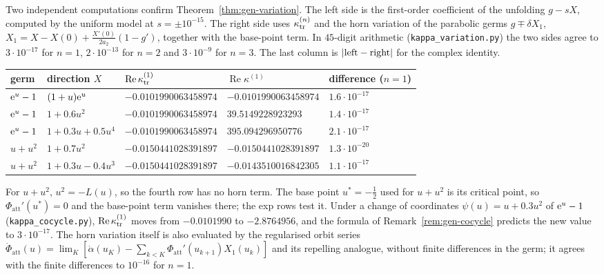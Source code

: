 \begin{remark}[Numerics]\label{rem:gen-variation}
Two independent computations confirm Theorem~\ref{thm:gen-variation}.  The left
side is the first-order coefficient of the unfolding $g-sX$, computed by the
uniform model at $s=\pm10^{-15}$.  The right side uses $\kappa^{(n)}_{\rm tr}$ and
the horn variation of the parabolic germs $g\mp\delta X_1$,
$X_1=X-X(0)+\tfrac{X'(0)}{2a_2}(1-g')$, together with the base-point term.  In
$45$-digit arithmetic (\texttt{kappa\_variation.py}) the two sides agree to
$3\cdot10^{-17}$ for $n=1$, $2\cdot10^{-13}$ for $n=2$ and $3\cdot10^{-9}$ for $n=3$.
The last column is $|{\rm left}-{\rm right}|$ for the complex identity.
\begin{center}\small
\begin{tabular}{lllll}
\toprule
germ & direction $X$ & $\operatorname{Re}\kappa^{(1)}_{\rm tr}$ & $\operatorname{Re}\kappa^{(1)}$ & difference ($n=1$)\\
\midrule
$\mathrm{e}^u-1$ & $(1+u)\mathrm{e}^u$ & $-0.0101990063458974$ & $-0.0101990063458974$ & $1.6\cdot10^{-17}$\\
$\mathrm{e}^u-1$ & $1+0.6u^2$ & $-0.0101990063458974$ & $39.5149228923293$ & $1.4\cdot10^{-17}$\\
$\mathrm{e}^u-1$ & $1+0.3u+0.5u^4$ & $-0.0101990063458974$ & $395.094296950776$ & $2.1\cdot10^{-17}$\\
$u+u^2$ & $1+0.7u^2$ & $-0.0150441028391897$ & $-0.0150441028391897$ & $1.3\cdot10^{-20}$\\
$u+u^2$ & $1+0.3u-0.4u^3$ & $-0.0150441028391897$ & $-0.0143510016842305$ & $1.1\cdot10^{-17}$\\
\bottomrule
\end{tabular}
\end{center}
For $u+u^2$, $u^2=-L(u)$, so the fourth row has no horn term.  The base point
$u^*=-\tfrac12$ used for $u+u^2$ is its critical point, so
$\Phi_{\mathrm{att}}'(u^*)=0$ and the base-point term vanishes there; the exp
rows test it.  Under a change of coordinates $\psi(u)=u+0.3u^2$ of
$\mathrm{e}^u-1$ (\texttt{kappa\_cocycle.py}), $\operatorname{Re}\kappa^{(1)}_{\rm tr}$
moves from $-0.0101990$ to $-2.8764956$, and the formula of
Remark~\ref{rem:gen-cocycle} predicts the new value to $3\cdot10^{-17}$.  The horn
variation itself is also evaluated by the regularised orbit series
$\dot\Phi_{\mathrm{att}}(u)=\lim_K[\dot\alpha(u_K)-\sum_{k<K}\Phi_{\mathrm{att}}'(u_{k+1})X_1(u_k)]$
and its repelling analogue, without finite differences in the germ; it agrees
with the finite differences to $10^{-16}$ for $n=1$.
\end{remark}

